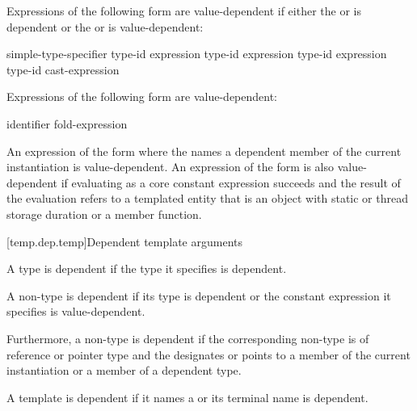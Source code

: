 \pnum
Expressions of the following form are value-dependent if either the
or
is dependent or the
or
is value-dependent:

\begin{ncsimplebnf}
simple-type-specifier \terminal{(}  \terminal{)}\br
{} \terminal{<} type-id \terminal{>} \terminal{(} expression \terminal{)}\br
{} \terminal{<} type-id \terminal{>} \terminal{(} expression \terminal{)}\br
{} \terminal{<} type-id \terminal{>} \terminal{(} expression \terminal{)}\br
\terminal{(} type-id \terminal{)} cast-expression
\end{ncsimplebnf}

\pnum
Expressions of the following form are value-dependent:

\begin{ncsimplebnf}
  \terminal{(} identifier \terminal{)}\br
fold-expression
\end{ncsimplebnf}

\pnum
An expression of the form \tcode{\&} where the
 names a dependent member of the current
instantiation is value-dependent.
An expression of the form \tcode{\&}
is also value-dependent if evaluating 
as a core constant expression succeeds and
the result of the evaluation refers to a templated entity
that is an object with static or thread storage duration or a member function.

[temp.dep.temp]{Dependent template arguments}

\pnum
A type
is dependent if the type it specifies is dependent.

\pnum
A non-type
is dependent if its type is dependent or the constant
expression it specifies is value-dependent.

\pnum
Furthermore, a non-type
is dependent if the corresponding non-type 
is of reference or pointer type and the 
designates or points to a member of the current instantiation or a member of
a dependent type.

\pnum
A template  is dependent if
it names a  or
its terminal name is dependent.

